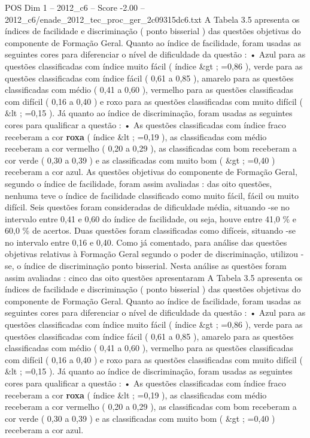 \begin{textsample}{POS Dim 1 – 2012\_c6 – Score -2.00 – 2012\_c6/enade\_2012\_tec\_proc\_ger\_2c09315dc6.txt}
A Tabela 3.5 apresenta os índices de facilidade e discriminação ( ponto bisserial ) das questões objetivas do componente de Formação Geral.
Quanto ao índice de facilidade, foram usadas as seguintes cores para diferenciar o nível de dificuldade da questão : • Azul para as questões classificadas com índice muito fácil ( índice \&gt ; =0,86 ), verde para as questões classificadas com índice fácil ( 0,61 a 0,85 ), amarelo para as questões classificadas com médio ( 0,41 a 0,60 ), vermelho para as questões classificadas com difícil ( 0,16 a 0,40 ) e roxo para as questões classificadas com muito difícil ( \&lt ; =0,15 ).
Já quanto ao índice de discriminação, foram usadas as seguintes cores para qualificar a questão : • As questões classificadas com índice fraco receberam a cor \textbf{roxa} ( índice \&lt ; =0,19 ), as classificadas com médio receberam a cor vermelho ( 0,20 a 0,29 ), as classificadas com bom receberam a cor verde ( 0,30 a 0,39 ) e as classificadas com muito bom ( \&gt ; =0,40 ) receberam a cor azul.
As questões objetivas do componente de Formação Geral, segundo o índice de facilidade, foram assim avaliadas : das oito questões, nenhuma teve o índice de facilidade classificado como muito fácil, fácil ou muito difícil.
Seis questões foram consideradas de dificuldade média, situando -se no intervalo entre 0,41 e 0,60 do índice de facilidade, ou seja, houve entre 41,0 \% e 60,0 \% de acertos.
Duas questões foram classificadas como difíceis, situando -se no intervalo entre 0,16 e 0,40.
Como já comentado, para análise das questões objetivas relativas à Formação Geral segundo o poder de discriminação, utilizou -se, o índice de discriminação ponto bisserial.
Nesta análise as questões foram assim avaliadas : cinco das oito questões apresentaram A Tabela 3.5 apresenta os índices de facilidade e discriminação ( ponto bisserial ) das questões objetivas do componente de Formação Geral.
Quanto ao índice de facilidade, foram usadas as seguintes cores para diferenciar o nível de dificuldade da questão : • Azul para as questões classificadas com índice muito fácil ( índice \&gt ; =0,86 ), verde para as questões classificadas com índice fácil ( 0,61 a 0,85 ), amarelo para as questões classificadas com médio ( 0,41 a 0,60 ), vermelho para as questões classificadas com difícil ( 0,16 a 0,40 ) e roxo para as questões classificadas com muito difícil ( \&lt ; =0,15 ).
Já quanto ao índice de discriminação, foram usadas as seguintes cores para qualificar a questão : • As questões classificadas com índice fraco receberam a cor \textbf{roxa} ( índice \&lt ; =0,19 ), as classificadas com médio receberam a cor vermelho ( 0,20 a 0,29 ), as classificadas com bom receberam a cor verde ( 0,30 a 0,39 ) e as classificadas com muito bom ( \&gt ; =0,40 ) receberam a cor azul.

\end{textsample}
